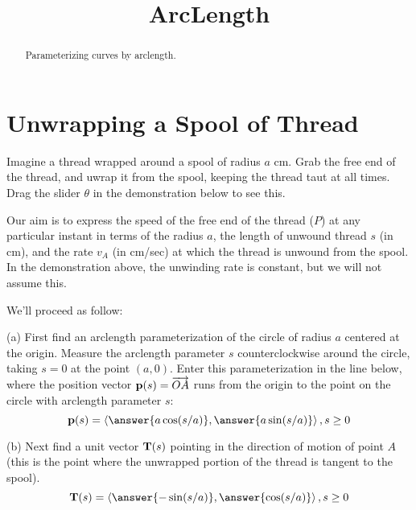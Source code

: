 \documentclass{ximera}
\title{ArcLength}
\begin{document}
\begin{abstract}
Parameterizing curves by arclength. 
\end{abstract}
\maketitle


\section{Unwrapping a Spool of Thread}

\begin{question}  \label{Qgdghubhgfdg}

Imagine a thread wrapped around a spool of radius $a$ cm. Grab the free end of the thread, and uwrap it from the spool, keeping the thread taut at all times. Drag the slider $\theta$ in the demonstration below to see this.

 
\begin{onlineOnly}
    \begin{center}
\end{center}
\end{onlineOnly}


Our aim is to express the speed of the free end of the thread ($P$) at any particular instant in terms of the radius $a$, the length of unwound thread $s$ (in cm), and the rate $v_A$ (in cm/sec) at which the thread is unwound from the spool. In the demonstration above, the unwinding rate is constant, but we will not assume this. 

We'll proceed as follow:

(a) First find an arclength parameterization of the circle of radius $a$ centered at the origin. Measure the arclength parameter $s$ counterclockwise around the circle, taking $s=0$ at the point $(a,0)$. Enter this parameterization in the line below, where the position vector ${\bf p}(s) = \overrightarrow{OA}$ runs from the origin to the point on the circle with arclength parameter $s$:
\[
    {\bf p}(s) = \langle \answer{a \cos (s/a)} , \answer{a \sin (s/a)}  \rangle \, , s\geq 0 
\]

(b) Next find a unit vector ${\bf T}(s)$ pointing in the direction of motion of point $A$ (this is the point where the unwrapped portion of the thread is tangent to the spool). 
\[
    {\bf T}(s) = \langle \answer{- \sin (s/a)} , \answer{\cos (s/a)}  \rangle \, , s\geq 0
\]


\end{question}
\end{document}
